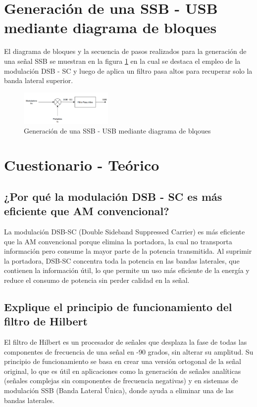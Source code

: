 \documentclass[conference]{IEEEtran}
\begin{document}
	\section{Generación de una SSB - USB mediante diagrama de bloques}
	
	El diagrama de bloques y la secuencia de pasos realizados para la generación de una señal SSB se muestran en la figura \ref{fig:generacion-usb-bloques} en la cual se destaca el empleo de la modulación DSB - SC y luego de aplica un filtro pasa altos para recuperar solo la banda lateral superior.
	
	\begin{figure}[h]
		\centering
		\includegraphics[width=0.4\textwidth]{media/generacion-usb-bloques}
		\caption{Generación de una SSB - USB mediante diagrama de blqoues}
		\label{fig:generacion-usb-bloques}
	\end{figure}
	
	\section{Cuestionario - Teórico}
	\subsection{\textbf{¿Por qué la modulación DSB - SC es más eficiente que AM convencional?}}
	La modulación DSB-SC (Double Sideband Suppressed Carrier) es más eficiente que la AM convencional porque elimina la portadora, la cual no transporta información pero consume la mayor parte de la potencia transmitida. Al suprimir la portadora, DSB-SC concentra toda la potencia en las bandas laterales, que contienen la información útil, lo que permite un uso más eficiente de la energía y reduce el consumo de potencia sin perder calidad en la señal.
	\subsection{\textbf{Explique el principio de funcionamiento del filtro de Hilbert}}
	El filtro de Hilbert es un procesador de señales que desplaza la fase de todas las componentes de frecuencia de una señal en -90 grados, sin alterar su amplitud. Su principio de funcionamiento se basa en crear una versión ortogonal de la señal original, lo que es útil en aplicaciones como la generación de señales analíticas (señales complejas sin componentes de frecuencia negativas) y en sistemas de modulación SSB (Banda Lateral Única), donde ayuda a eliminar una de las bandas laterales.
\end{document}
